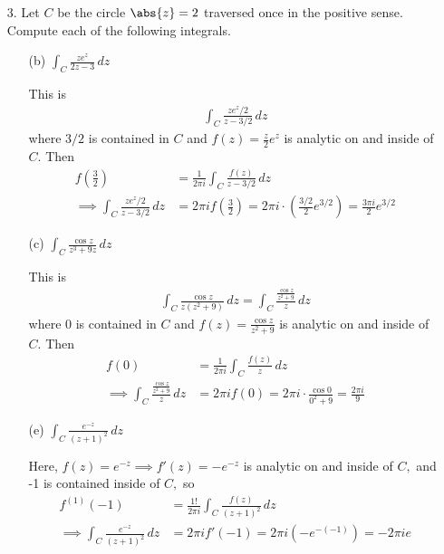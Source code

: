 \documentclass{article}
\begin{document}
\begin{itemize}
	\item[3.] Let $C$ be the circle $\abs{z}=2$ traversed once in the positive sense. Compute each of the following integrals.
		\begin{itemize}
			\item[(b)] $\int_C \frac{ze^z}{2z-3}\, dz$
				\begin{soln}
					This is
					\begin{align*}
						\int_C \frac{ze^z/2}{z-3/2}\, dz
					\end{align*}
					where $3/2$ is contained in $C$ and $f(z)=\frac{z}{2}e^z$ is analytic on and inside of $C.$ Then
					\begin{align*}
						f\left( \frac{3}{2} \right) &= \frac{1}{2\pi i}\int_C \frac{f(z)}{z-3/2}\, dz \\
						\implies \int_C \frac{ze^z/2}{z-3/2}\, dz &= 2\pi i f\left( \frac{3}{2} \right) = 2\pi i \cdot\left( \frac{3/2}{2} e^{3/2} \right) = \frac{3\pi i}{2}e^{3/2}
					\end{align*}
				\end{soln}

			\item[(c)] $\int_C \frac{\cos z}{z^3+9z}\, dz$
				\begin{soln}
					This is
					\begin{align*}
						\int_C \frac{\cos z}{z(z^2+9)}\, dz = \int_C \frac{\frac{\cos z}{z^2+9}}{z}\, dz
					\end{align*}
					where 0 is contained in $C$ and $f(z)=\frac{\cos z}{z^2+9}$ is analytic on and inside of $C.$ Then
					\begin{align*}
						f\left( 0 \right) &= \frac{1}{2\pi i}\int_C \frac{f(z)}{z}\, dz \\
						\implies \int_C \frac{\frac{\cos z}{z^2+9}}{z}\, dz &= 2\pi i f(0) = 2\pi i \cdot \frac{\cos 0}{0^2+9} = \frac{2\pi i}{9}
					\end{align*}
				\end{soln}

			\item[(e)] $\int_C \frac{e^{-z}}{(z+1)^2}\, dz$
				\begin{soln}
					Here, $f(z)=e^{-z}\implies f'(z)=-e^{-z}$ is analytic on and inside of $C,$ and -1 is contained inside of $C,$ so 
					\begin{align*}
						f^{(1)}(-1) &= \frac{1!}{2\pi i}\int_C \frac{f(z)}{(z+1)^2}\, dz \\
						\implies \int_C \frac{e^{-z}}{(z+1)^2}\, dz &= 2\pi i f'(-1) = 2\pi i (-e^{-(-1)}) = -2\pi i e
					\end{align*}
				\end{soln}
				

\end{itemize}
\end{itemize}
\end{document}
